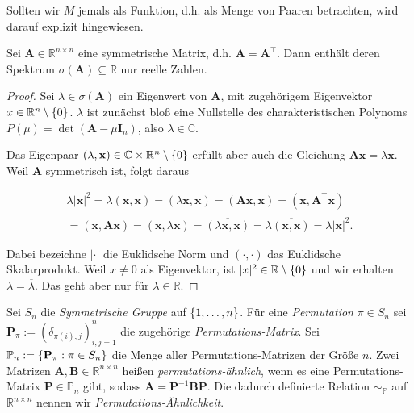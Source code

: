 Sollten wir $M$ jemals als Funktion, d.h. als Menge von Paaren betrachten, wird darauf explizit hingewiesen.

\begin{lemma}

    Sei $\mathbf A \in \mathbb R^{n \times n}$ eine symmetrische Matrix, d.h. $\mathbf A = \mathbf A^\top$.
    Dann enthält deren Spektrum $\sigma(\mathbf A) \subseteq \mathbb R$ nur reelle Zahlen.

\end{lemma}

\begin{proof}
    Sei $\lambda \in \sigma(\mathbf A)$ ein Eigenwert von $\mathbf A$, mit zugehörigem Eigenvektor $x \in \mathbb R^n \setminus {\left \{ 0 \right \}}$.
    $\lambda$ ist zunächst bloß eine Nullstelle des charakteristischen Polynoms $P(\mu) = \det(\mathbf A - \mu \mathbf I_n)$, also $\lambda \in \mathbb C$.

    Das Eigenpaar $(\lambda, \mathbf x) \in \mathbb C \times \mathbb R^n \setminus {\left \{ 0 \right \}}$ erfüllt aber auch die Gleichung $\mathbf A \mathbf x = \lambda \mathbf x$.
    Weil $\mathbf A$ symmetrisch ist, folgt daraus

    \begin{multline*}
        \lambda |\mathbf x|^2
        =
        \lambda (\mathbf x, \mathbf x)
        =
        (\lambda \mathbf x, \mathbf x)
        =
        (\mathbf A \mathbf x, \mathbf x)
        =
        (\mathbf x, \mathbf A^\top \mathbf x) \\
        =
        (\mathbf x, \mathbf A \mathbf x)
        =
        (\mathbf x, \lambda \mathbf x)
        =
        \overline{(\lambda \mathbf x, \mathbf x)}
        =
        \overline \lambda \overline{(\mathbf x, \mathbf x)}
        =
        \overline \lambda \overline{|\mathbf x|^2}.
    \end{multline*}

    Dabei bezeichne $|\cdot|$ die Euklidsche Norm und $(\cdot, \cdot)$ das Euklidsche Skalarprodukt.
    Weil $x \neq 0$ als Eigenvektor, ist $|x|^2 \in \mathbb R \setminus {\left \{ 0 \right \}}$ und wir erhalten $\lambda = \overline \lambda$.
    Das geht aber nur für $\lambda \in \mathbb R$.

\end{proof}

\begin{definition}
    
    Sei $S_n$ die \textit{Symmetrische Gruppe} auf ${\left \{ 1, \dots, n \right \}}$.
    Für eine \textit{Permutation} $\pi \in S_n$ sei $\mathbf P_\pi := (\delta_{\pi(i), j})_{i, j = 1}^n$ die zugehörige \textit{Permutations-Matrix}.
    Sei $\mathbb P_n := {\left \{ \mathbf P_\pi: \pi \in S_n \right \}}$ die Menge aller Permutations-Matrizen der Größe $n$.
    Zwei Matrizen $\mathbf A, \mathbf B \in \mathbb R^{n \times n}$ heißen \textit{permutations-ähnlich}, wenn es eine Permutations-Matrix $\mathbf P \in \mathbb P_n$ gibt, sodass $\mathbf A = \mathbf P^{-1} \mathbf B \mathbf P$.
    Die dadurch definierte Relation $\sim_{\mathbb P}$ auf $\mathbb R^{n \times n}$ nennen wir \textit{Permutations-Ähnlichkeit}.

\end{definition}

